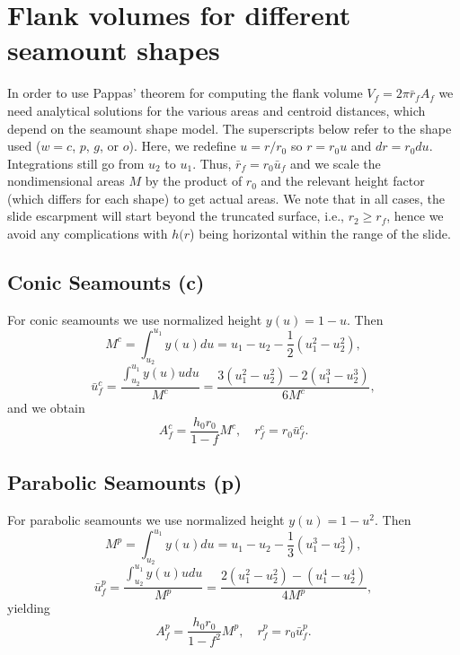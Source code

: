 %

\appendix

\section{Flank volumes for different seamount shapes}
\label{app1}

In order to use Pappas' theorem for computing the flank volume $V_f = 2 \pi \bar{r}_f A_f$ we need
analytical solutions for the various areas and centroid distances, which depend on the seamount
shape model.  The superscripts below refer to the shape used ($w = c$, $p$, $g$, or $o$). Here,
we redefine $u = r/r_0$ so $r = r_0 u$ and $dr = r_0 du$.  Integrations still go from $u_2$
to $u_1$.  Thus, $\bar{r}_f = r_0 \bar{u}_f$ and we scale the nondimensional areas $M$
by the product of $r_0$ and the relevant height factor (which differs for each shape) to get actual
areas. We note that in all cases, the slide escarpment will start beyond the truncated surface, i.e.,
$r_2 \ge r_f$, hence we avoid any complications with $h(r$) being horizontal within the range of the slide.

\subsection{Conic Seamounts (c)}

For conic seamounts we use normalized height $y(u) = 1 - u$. Then
\begin{equation*}
M^c = \int_{u_2}^{u_1} y(u) du = u_1 - u_2 - \frac{1}{2}\left ( u_1^2 - u_2^2 \right ),
\end{equation*}
\begin{equation*}
\bar{u}_f^c = \frac{\int_{u_2}^{u_1} y(u) u du}{M^c} = \frac{3(u_1^2 - u_2^2) - 2 (u_1^3 - u_2^3)}{6M^c},
\end{equation*}
and we obtain
\begin{equation}
A_f^c = \frac{h_0 r_0}{1-f}M^c, \quad r_f^c = r_0\bar{u}_f^c.
\end{equation}

\subsection{Parabolic Seamounts (p)}

For parabolic seamounts we use normalized height $y(u) = 1 - u^2$. Then
\begin{equation*}
M^p = \int_{u_2}^{u_1} y(u) du = u_1 - u_2 - \frac{1}{3}\left ( u_1^3 - u_2^3 \right ),
\end{equation*}
\begin{equation*}
\bar{u}_f^p = \frac{\int_{u_2}^{u_1} y(u) u du}{M^p} = \frac{2(u_1^2 - u_2^2) - (u_1^4 - u_2^4)}{4M^p},
\end{equation*}
yielding
\begin{equation}
A_f^p = \frac{h_0 r_0}{1-f^2}M^p, \quad r_f^p = r_0\bar{u}_f^p.
\end{equation}

